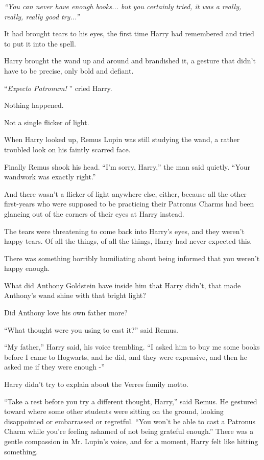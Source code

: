 \emph{``You can never have enough books... but you certainly tried,
it was a really, really, really good try...''}

It had brought tears to his eyes, the first time Harry had remembered
and tried to put it into the spell.

Harry brought the wand up and around and brandished it, a gesture that
didn't have to be precise, only bold and defiant.

``\emph{Expecto Patronum!} '' cried Harry.

Nothing happened.

Not a single flicker of light.

When Harry looked up, Remus Lupin was still studying the wand, a rather
troubled look on his faintly scarred face.

Finally Remus shook his head. ``I'm sorry, Harry,'' the man said
quietly. ``Your wandwork was exactly right.''

And there wasn't a flicker of light anywhere else, either, because all
the other first-years who were supposed to be practicing their Patronus
Charms had been glancing out of the corners of their eyes at Harry
instead.

The tears were threatening to come back into Harry's eyes, and they
weren't happy tears. Of all the things, of all the things, Harry had
never expected this.

There was something horribly humiliating about being informed that you
weren't happy enough.

What did Anthony Goldstein have inside him that Harry didn't, that made
Anthony's wand shine with that bright light?

Did Anthony love his own father more?

``What thought were you using to cast it?'' said Remus.

``My father,'' Harry said, his voice trembling. ``I asked him to buy me
some books before I came to Hogwarts, and he did, and they were
expensive, and then he asked me if they were enough -''

Harry didn't try to explain about the Verres family motto.

``Take a rest before you try a different thought, Harry,'' said Remus.
He gestured toward where some other students were sitting on the ground,
looking disappointed or embarrassed or regretful. ``You won't be able to
cast a Patronus Charm while you're feeling ashamed of not being grateful
enough.'' There was a gentle compassion in Mr. Lupin's voice, and for a
moment, Harry felt like hitting something.

